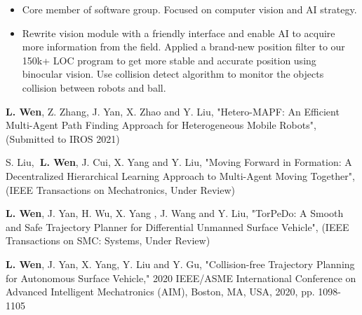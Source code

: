 {\small
  \begin{itemize}
    \item Core member of software group. Focused on computer vision and AI strategy.
    \item Rewrite vision module with a friendly interface and enable AI to acquire more information from the field. Applied a brand-new position filter to our 150k+ LOC program to get more stable and accurate position using binocular vision. Use collision detect algorithm to monitor the objects collision between robots and ball.
  \end{itemize}
}


\begin{itemize}[leftmargin=*]
  {\small
  \item
        \textbf{L. Wen}, Z. Zhang, J. Yan, X. Zhao and Y. Liu, "Hetero-MAPF: An Efficient Multi-Agent Path Finding Approach
        for Heterogeneous Mobile Robots", (Submitted to IROS 2021)
  \item
        S. Liu,\textbf{ L. Wen}, J. Cui, X. Yang and Y. Liu, "Moving Forward in Formation: A Decentralized Hierarchical Learning Approach to Multi-Agent Moving Together", (IEEE Transactions on Mechatronics, Under Review)

  \item
        \textbf{L. Wen}, J. Yan, H. Wu, X. Yang , J. Wang and Y. Liu, "TorPeDo: A Smooth and Safe Trajectory Planner for Differential Unmanned Surface Vehicle", (IEEE Transactions on SMC: Systems, Under Review)

  \item
        \textbf{L. Wen}, J. Yan, X. Yang, Y. Liu and Y. Gu, "Collision-free Trajectory Planning for Autonomous Surface Vehicle," 2020 IEEE/ASME International Conference on Advanced Intelligent Mechatronics (AIM), Boston, MA, USA, 2020, pp. 1098-1105
        }
\end{itemize}